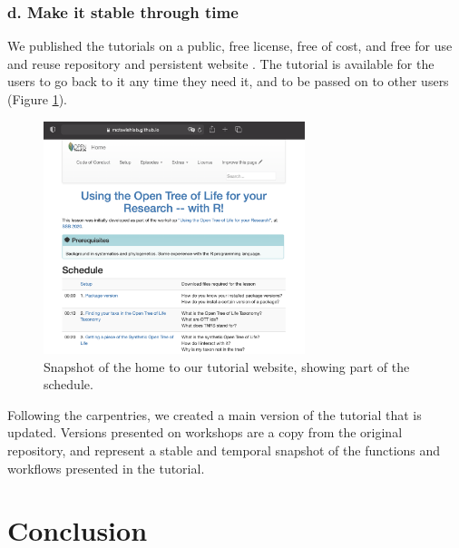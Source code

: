 \documentclass[12pt]{article}
\begin{document}
\subsubsection*{d. Make it stable through time}

We published the tutorials on a public, free license, free of cost, and free for
use and reuse repository and persistent website \citep{RopentreeTutorials, RopentreeTutorialsWebsite}.
The tutorial is available for the users to go back to it any time they need it,
and to be passed on to other users (Figure \ref{fig:second}).

\begin{figure}
\begin{center}
\includegraphics[width=3in]{fig2.png}
\end{center}
\caption{Snapshot of the home to our tutorial website, showing part of the schedule. \label{fig:second}}
\end{figure}

Following the carpentries, we created a main version of the tutorial that
is updated. Versions presented on workshops are a copy from the original repository,
and represent a stable and temporal snapshot of the functions and workflows presented
in the tutorial.


\section*{Conclusion}
\label{sec:conclusion}
\end{document}

